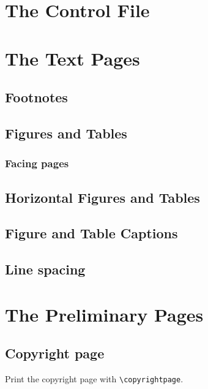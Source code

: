 \documentclass [11pt, proquest] {uwthesis}[2020/02/24]
\begin{document}
\section{The Control File}



\section{The Text Pages}




\subsection{Footnotes}

\label{footnotes}


\subsection{Figures and Tables}


\subsubsection{Facing pages}






\subsection{Horizontal Figures and Tables}




\subsection{Figure and Table Captions}



\subsection{Line spacing}


\section{The Preliminary Pages}



\subsection{Copyright page}
Print the copyright page with \verb"\copyrightpage".
\end{document}
